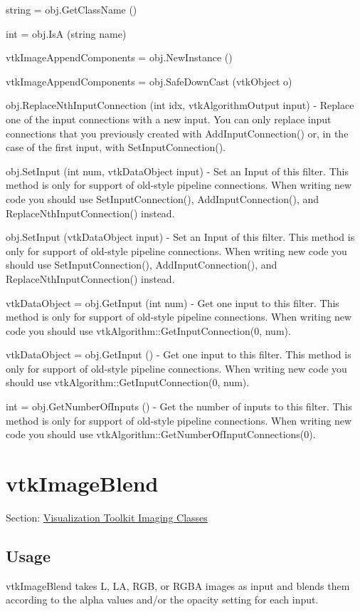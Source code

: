 \begin{DoxyItemize}
\item {\ttfamily string = obj.\-Get\-Class\-Name ()}  
\item {\ttfamily int = obj.\-Is\-A (string name)}  
\item {\ttfamily vtk\-Image\-Append\-Components = obj.\-New\-Instance ()}  
\item {\ttfamily vtk\-Image\-Append\-Components = obj.\-Safe\-Down\-Cast (vtk\-Object o)}  
\item {\ttfamily obj.\-Replace\-Nth\-Input\-Connection (int idx, vtk\-Algorithm\-Output input)} -\/ Replace one of the input connections with a new input. You can only replace input connections that you previously created with Add\-Input\-Connection() or, in the case of the first input, with Set\-Input\-Connection().  
\item {\ttfamily obj.\-Set\-Input (int num, vtk\-Data\-Object input)} -\/ Set an Input of this filter. This method is only for support of old-\/style pipeline connections. When writing new code you should use Set\-Input\-Connection(), Add\-Input\-Connection(), and Replace\-Nth\-Input\-Connection() instead.  
\item {\ttfamily obj.\-Set\-Input (vtk\-Data\-Object input)} -\/ Set an Input of this filter. This method is only for support of old-\/style pipeline connections. When writing new code you should use Set\-Input\-Connection(), Add\-Input\-Connection(), and Replace\-Nth\-Input\-Connection() instead.  
\item {\ttfamily vtk\-Data\-Object = obj.\-Get\-Input (int num)} -\/ Get one input to this filter. This method is only for support of old-\/style pipeline connections. When writing new code you should use vtk\-Algorithm\-::\-Get\-Input\-Connection(0, num).  
\item {\ttfamily vtk\-Data\-Object = obj.\-Get\-Input ()} -\/ Get one input to this filter. This method is only for support of old-\/style pipeline connections. When writing new code you should use vtk\-Algorithm\-::\-Get\-Input\-Connection(0, num).  
\item {\ttfamily int = obj.\-Get\-Number\-Of\-Inputs ()} -\/ Get the number of inputs to this filter. This method is only for support of old-\/style pipeline connections. When writing new code you should use vtk\-Algorithm\-::\-Get\-Number\-Of\-Input\-Connections(0).  
\end{DoxyItemize}\hypertarget{vtkimaging_vtkimageblend}{}\section{vtk\-Image\-Blend}\label{vtkimaging_vtkimageblend}
Section\-: \hyperlink{sec_vtkimaging}{Visualization Toolkit Imaging Classes} \hypertarget{vtkwidgets_vtkxyplotwidget_Usage}{}\subsection{Usage}\label{vtkwidgets_vtkxyplotwidget_Usage}
vtk\-Image\-Blend takes L, L\-A, R\-G\-B, or R\-G\-B\-A images as input and blends them according to the alpha values and/or the opacity setting for each input.

